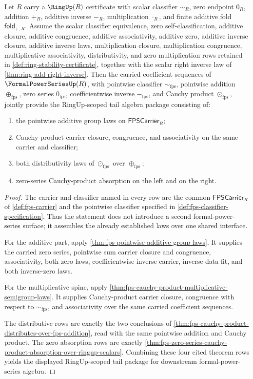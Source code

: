 \begin{theorem}
\label{thm:fps-ringup-tail-algebra-package}
Let $R$ carry a $\RingUp(R)$ certificate with scalar classifier $\sim_R$, zero endpoint $0_R$, addition $+_R$, additive inverse $-_R$, multiplication $\cdot_R$, and finite additive fold $\mathsf{fold}_{+,R}$. Assume the scalar classifier equivalence, zero self-classification, additive closure, additive congruence, additive associativity, additive zero, additive inverse closure, additive inverse laws, multiplication closure, multiplication congruence, multiplicative associativity, distributivity, and zero multiplication rows retained in \autoref{def:ring-stability-certificate}, together with the scalar right inverse law of \autoref{thm:ring-add-right-inverse}. Then the carried coefficient sequences of $\FormalPowerSeriesUp(R)$, with pointwise classifier $\sim_{\mathrm{fps}}$, pointwise addition $\oplus_{\mathrm{fps}}$, zero series $0_{\mathrm{fps}}$, coefficientwise inverse $-_{\mathrm{fps}}$, and Cauchy product $\odot_{\mathrm{fps}}$, jointly provide the RingUp-scoped tail algebra package consisting of:
\begin{enumerate}
\item the pointwise additive group laws on $\mathsf{FPSCarrier}_R$;
\item Cauchy-product carrier closure, congruence, and associativity on the same carrier and classifier;
\item both distributivity laws of $\odot_{\mathrm{fps}}$ over $\oplus_{\mathrm{fps}}$;
\item zero-series Cauchy-product absorption on the left and on the right.
\end{enumerate}
\end{theorem}
\begin{proof}
The carrier and classifier named in every row are the common $\mathsf{FPSCarrier}_R$ of \autoref{def:fps-carrier} and the pointwise classifier specified in \autoref{def:fps-classifier-specification}. Thus the statement does not introduce a second formal-power-series surface; it assembles the already established laws over one shared interface.

For the additive part, apply \autoref{thm:fps-pointwise-additive-group-laws}. It supplies the carried zero series, pointwise sum carrier closure and congruence, associativity, both zero laws, coefficientwise inverse carrier, inverse-data fit, and both inverse-zero laws.

For the multiplicative spine, apply \autoref{thm:fps-cauchy-product-multiplicative-semigroup-laws}. It supplies Cauchy-product carrier closure, congruence with respect to $\sim_{\mathrm{fps}}$, and associativity over the same carried coefficient sequences.

The distributive rows are exactly the two conclusions of \autoref{thm:fps-cauchy-product-distributes-over-fps-addition}, read with the same pointwise addition and Cauchy product. The zero absorption rows are exactly \autoref{thm:fps-zero-series-cauchy-product-absorption-over-ringup-scalars}. Combining these four cited theorem rows yields the displayed RingUp-scoped tail package for downstream formal-power-series algebra.
\end{proof}
